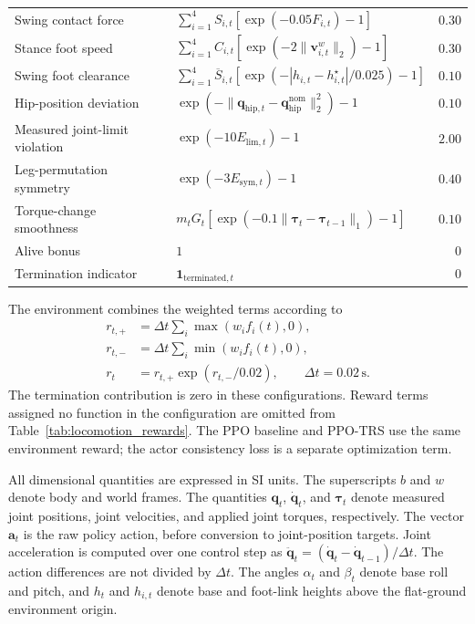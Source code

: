 \begin{table}[t]
\begin{tabular}{@{}llr@{}}
        Swing contact force & $\displaystyle\sum_{i=1}^{4} S_{i,t}\left[\exp(-0.05F_{i,t})-1\right]$ & $0.30$ \\
        Stance foot speed & $\displaystyle\sum_{i=1}^{4} C_{i,t}\left[\exp(-2\|\mathbf v^w_{i,t}\|_2)-1\right]$ & $0.30$ \\
        Swing foot clearance & $\displaystyle\sum_{i=1}^{4}\overline S_{i,t}\left[\exp\!\left(-|h_{i,t}-h^\star_{i,t}|/0.025\right)-1\right]$ & $0.10$ \\
        Hip-position deviation & $\exp\!\left(-\|\mathbf q_{\mathrm{hip},t}-\mathbf q_{\mathrm{hip}}^{\mathrm{nom}}\|_2^2\right)-1$ & $0.10$ \\
        Measured joint-limit violation & $\exp(-10E_{\mathrm{lim},t})-1$ & $2.00$ \\
        Leg-permutation symmetry & $\exp(-3E_{\mathrm{sym},t})-1$ & $0.40$ \\
        Torque-change smoothness & $m_tG_t\left[\exp\!\left(-0.1\|\boldsymbol\tau_t-\boldsymbol\tau_{t-1}\|_1\right)-1\right]$ & $0.10$ \\
        \midrule
        Alive bonus & $1$ & $0$ \\
        Termination indicator & $\mathbf 1_{\mathrm{terminated},t}$ & $0$ \\
        \bottomrule
    \end{tabular}
\end{table}

The environment combines the weighted terms according to
\begin{equation}
\begin{aligned}
    r_{t,+} &= \Delta t\sum_i\max\!\left(w_i f_i(t),0\right),\\
    r_{t,-} &= \Delta t\sum_i\min\!\left(w_i f_i(t),0\right),\\
    r_t &= r_{t,+}\exp\!\left(r_{t,-}/0.02\right),
    \qquad \Delta t=0.02\,\mathrm{s}.
\end{aligned}
\label{eq:locomotion_reward_composition}
\end{equation}
The termination contribution is zero in these configurations. Reward terms assigned no function in the configuration are omitted from Table~\ref{tab:locomotion_rewards}. The PPO baseline and PPO-TRS use the same environment reward; the actor consistency loss is a separate optimization term.

All dimensional quantities are expressed in SI units. The superscripts $b$ and $w$ denote body and world frames. The quantities $\mathbf q_t$, $\dot{\mathbf q}_t$, and $\boldsymbol\tau_t$ denote measured joint positions, joint velocities, and applied joint torques, respectively. The vector $\mathbf a_t$ is the raw policy action, before conversion to joint-position targets. Joint acceleration is computed over one control step as $\ddot{\mathbf q}_t=(\dot{\mathbf q}_t-\dot{\mathbf q}_{t-1})/\Delta t$. The action differences are not divided by $\Delta t$. The angles $\alpha_t$ and $\beta_t$ denote base roll and pitch, and $h_t$ and $h_{i,t}$ denote base and foot-link heights above the flat-ground environment origin.

